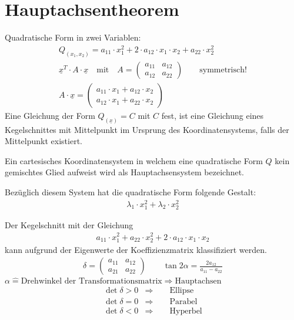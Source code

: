 \section{Hauptachsentheorem}
Quadratische Form in zwei Variablen:
\begin{gather}
  Q_{(x_1, x_2)} = a_{11}\cdot x_1^2 + 2\cdot a_{12}\cdot x_1 \cdot x_2 + a_{22}\cdot x_2^2 \\
  \underline{x}^T \cdot A \cdot\underline{x} \quad\text{mit}\quad A = \begin{pmatrix}
		a_{11} & a_{12} \\ a_{12} & a_{22}
	\end{pmatrix} \qquad\text{symmetrisch!} \\
  A\cdot\underline{x} = \begin{pmatrix}
		a_{11}\cdot x_1 + a_{12}\cdot x_2 \\
		a_{12}\cdot x_1 + a_{22}\cdot x_2
	\end{pmatrix}
\end{gather}
Eine Gleichung der Form $Q_{(\underline{x})} = C$ mit $C$ fest, ist eine Gleichung eines Kegelschnittes mit Mittelpunkt im Ursprung des Koordinatensystems, falls der Mittelpunkt existiert.

Ein cartesisches Koordinatensystem in welchem eine quadratische Form $Q$ kein gemischtes Glied aufweist wird als Hauptachsensystem bezeichnet.

Bez\"uglich diesem System hat die quadratische Form folgende Gestalt:
\begin{gather}
  \lambda_1 \cdot x_1^2 + \lambda_2 \cdot x_2^2
\end{gather}

Der Kegelschnitt mit der Gleichung
\begin{gather}
  a_{11}\cdot x_1^2 + a_{22}\cdot x_2^2 + 2\cdot a_{12}\cdot x_1 \cdot x_2
\end{gather}
kann aufgrund der Eigenwerte der Koeffizienzmatrix klassifiziert werden.
\begin{gather}
  \delta = \begin{pmatrix}
		a_{11} & a_{12} \\ a_{21} & a_{22}
	\end{pmatrix} \qquad \tan{2\alpha} = \frac{2a_{12}}{a_{11}-a_{22}}
\end{gather}
$\alpha\hat{=}\text{Drehwinkel der Transformationsmatrix}\Rightarrow\text{Hauptachsen}$
\begin{align}
  \det{\delta} > 0 &\Longrightarrow \qquad\text{Ellipse} \\
  \det{\delta} = 0 &\Longrightarrow \qquad\text{Parabel} \\
  \det{\delta} < 0 &\Longrightarrow \qquad\text{Hyperbel}
\end{align}


